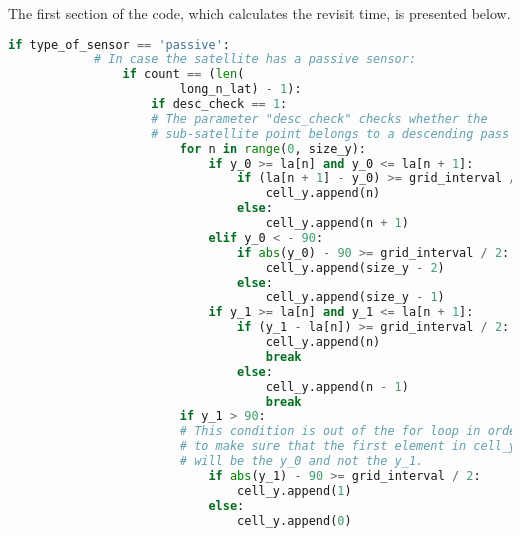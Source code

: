 \documentclass[12pt,a4paper,notitlepage,oneside,openright]{report}
\begin{document}
The first section of the code, which calculates the revisit time, is presented below.
\begin{center}
\begin{lstlisting}[language=Python, formfeed=\newpage, extendedchars=true] 
            if type_of_sensor == 'passive': 
            # In case the satellite has a passive sensor:
                if count == (len(
                        long_n_lat) - 1): 
                    if desc_check == 1:
                    # The parameter "desc_check" checks whether the
                    # sub-satellite point belongs to a descending pass
                        for n in range(0, size_y):
                            if y_0 >= la[n] and y_0 <= la[n + 1]:
                                if (la[n + 1] - y_0) >= grid_interval / 2:
                                    cell_y.append(n)
                                else:
                                    cell_y.append(n + 1)
                            elif y_0 < - 90:
                                if abs(y_0) - 90 >= grid_interval / 2:
                                    cell_y.append(size_y - 2)
                                else:
                                    cell_y.append(size_y - 1)
                            if y_1 >= la[n] and y_1 <= la[n + 1]:
                                if (y_1 - la[n]) >= grid_interval / 2:
                                    cell_y.append(n)
                                    break
                                else:
                                    cell_y.append(n - 1)
                                    break
                        if y_1 > 90: 
                        # This condition is out of the for loop in order
                        # to make sure that the first element in cell_y
                        # will be the y_0 and not the y_1.
                            if abs(y_1) - 90 >= grid_interval / 2:
                                cell_y.append(1)
                            else:
                                cell_y.append(0)


\end{lstlisting}
\end{center}
\end{document}
